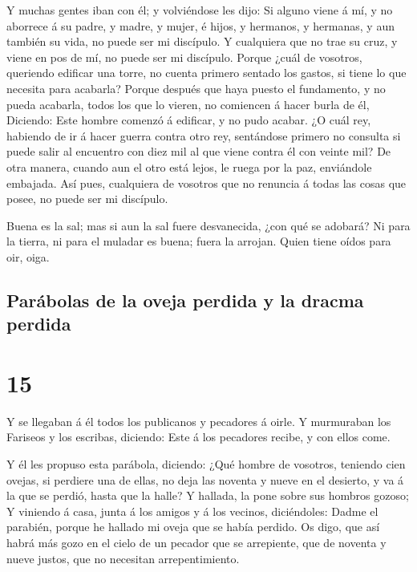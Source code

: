  Y muchas gentes iban con él; y volviéndose les dijo:
 Si alguno viene á mí, y no aborrece á su padre, y madre,
y mujer, é hijos, y hermanos, y hermanas, y aun también su vida, no
puede ser mi discípulo.  Y cualquiera que no trae su
cruz, y viene en pos de mí, no puede ser mi discípulo. 
Porque ¿cuál de vosotros, queriendo edificar una torre, no cuenta
primero sentado los gastos, si tiene lo que necesita para acabarla?
 Porque después que haya puesto el fundamento, y no pueda
acabarla, todos los que lo vieren, no comiencen á hacer burla de él,
 Diciendo: Este hombre comenzó á edificar, y no pudo
acabar.  ¿O cuál rey, habiendo de ir á hacer guerra
contra otro rey, sentándose primero no consulta si puede salir al
encuentro con diez mil al que viene contra él con veinte mil?
 De otra manera, cuando aun el otro está lejos, le ruega
por la paz, enviándole embajada.  Así pues, cualquiera de
vosotros que no renuncia á todas las cosas que posee, no puede ser mi
discípulo.

 Buena es la sal; mas si aun la sal fuere desvanecida,
¿con qué se adobará?  Ni para la tierra, ni para el
muladar es buena; fuera la arrojan. Quien tiene oídos para oir, oiga.

\hypertarget{paruxe1bolas-de-la-oveja-perdida-y-la-dracma-perdida}{%
\subsection{Parábolas de la oveja perdida y la dracma
perdida}\label{paruxe1bolas-de-la-oveja-perdida-y-la-dracma-perdida}}

\hypertarget{section-42-15}{%
\section{15}\label{section-42-15}}

 Y se llegaban á él todos los publicanos y pecadores á
oirle.  Y murmuraban los Fariseos y los escribas,
diciendo: Este á los pecadores recibe, y con ellos come.

 Y él les propuso esta parábola, diciendo: 
¿Qué hombre de vosotros, teniendo cien ovejas, si perdiere una de ellas,
no deja las noventa y nueve en el desierto, y va á la que se perdió,
hasta que la halle?  Y hallada, la pone sobre sus hombros
gozoso;  Y viniendo á casa, junta á los amigos y á los
vecinos, diciéndoles: Dadme el parabién, porque he hallado mi oveja que
se había perdido.  Os digo, que así habrá más gozo en el
cielo de un pecador que se arrepiente, que de noventa y nueve justos,
que no necesitan arrepentimiento.


